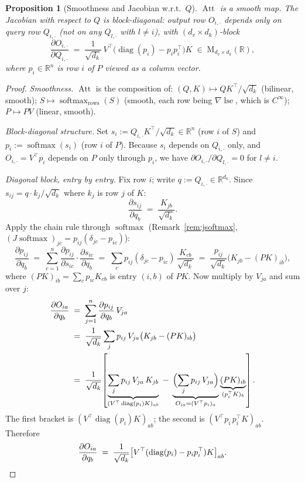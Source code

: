 \documentclass[11pt]{amsart}
\theoremstyle{plain}
\newtheorem{proposition}[theorem]{Proposition}
\theoremstyle{definition}
\newcommand{\R}{\mathbb{R}}
\newcommand{\Mat}[2]{\mathrm{M}_{#1 \times #2}(\R)}
\newcommand{\softmax}{\operatorname{softmax}}
\newcommand{\logsumexp}{\operatorname{lse}}
\newcommand{\Att}{\operatorname{Att}}
\newcommand{\diag}{\operatorname{diag}}
\begin{document}
\begin{proposition}[Smoothness and Jacobian w.r.t.\ $Q$]
\label{prop:att-smoothness}
$\Att$ is a smooth map.  The Jacobian with respect to $Q$ is block-diagonal:
output row $O_{i,\cdot}$ depends only on query row $Q_{i,\cdot}$ (not on any
$Q_{l,\cdot}$ with $l\neq i$), with $(d_v\times d_k)$-block
\[
    \frac{\partial O_{i,\cdot}}{\partial Q_{i,\cdot}}
    \;=\; \frac{1}{\sqrt{d_k}}\,
    V^\top\bigl(\diag(p_i) - p_i p_i^\top\bigr) K
    \;\in\; \Mat{d_v}{d_k},
\]
where $p_i \in \R^n$ is row $i$ of $P$ viewed as a column vector.
\end{proposition}
\begin{proof}
\textit{Smoothness.}  $\Att$ is the composition of:
$(Q,K)\mapsto QK^\top/\sqrt{d_k}$ (bilinear, smooth);
$S\mapsto\softmax_{\mathrm{rows}}(S)$ (smooth, each row being $\nabla\logsumexp$,
which is $C^\infty$);
$P\mapsto PV$ (linear, smooth).

\textit{Block-diagonal structure.}  Set $s_i := Q_{i,\cdot}K^\top/\sqrt{d_k}\in\R^n$
(row $i$ of $S$) and $p_i := \softmax(s_i)$ (row $i$ of $P$).  Because $s_i$
depends on $Q_{i,\cdot}$ only, and $O_{i,\cdot} = V^\top p_i$ depends on $P$
only through $p_i$, we have $\partial O_{i,\cdot}/\partial Q_{l,\cdot} = 0$ for
$l\neq i$.

\textit{Diagonal block, entry by entry.}  Fix row $i$; write $q := Q_{i,\cdot}\in\R^{d_k}$.
Since $s_{ij} = q\cdot k_j/\sqrt{d_k}$ where $k_j$ is row $j$ of $K$:
\[
    \frac{\partial s_{ij}}{\partial q_b} \;=\; \frac{K_{jb}}{\sqrt{d_k}}.
\]
Apply the chain rule through $\softmax$ (Remark~\ref{rem:jsoftmax},
$(J\softmax)_{jc} = p_{ij}(\delta_{jc}-p_{ic})$):
\[
    \frac{\partial p_{ij}}{\partial q_b}
    \;=\; \sum_{c=1}^n \frac{\partial p_{ij}}{\partial s_{ic}}
          \cdot\frac{\partial s_{ic}}{\partial q_b}
    \;=\; \sum_c p_{ij}(\delta_{jc} - p_{ic})\,\frac{K_{cb}}{\sqrt{d_k}}
    \;=\; \frac{p_{ij}}{\sqrt{d_k}}\bigl(K_{jb} - (PK)_{ib}\bigr),
\]
where $(PK)_{ib} = \sum_c p_{ic}K_{cb}$ is entry $(i,b)$ of $PK$.
Now multiply by $V_{ja}$ and sum over $j$:
\begin{align*}
    \frac{\partial O_{ia}}{\partial q_b}
    &\;=\; \sum_{j=1}^n \frac{\partial p_{ij}}{\partial q_b}\,V_{ja} \\
    &\;=\; \frac{1}{\sqrt{d_k}}\sum_j p_{ij}\,V_{ja}
            \bigl(K_{jb} - (PK)_{ib}\bigr) \\
    &\;=\; \frac{1}{\sqrt{d_k}}\!\left[
            \underbrace{\sum_j p_{ij}\,V_{ja}\,K_{jb}}_{(V^\top\diag(p_i)K)_{ab}}
            \;-\;
            \underbrace{\Bigl(\sum_j p_{ij}\,V_{ja}\Bigr)}_{O_{ia}=(V^\top p_i)_a}
            \underbrace{(PK)_{ib}}_{(p_i^\top K)_b}
          \right].
\end{align*}
The first bracket is $(V^\top\diag(p_i)K)_{ab}$; the second is
$(V^\top p_i\,p_i^\top K)_{ab}$.  Therefore
\[
    \frac{\partial O_{ia}}{\partial q_b}
    \;=\; \frac{1}{\sqrt{d_k}}\bigl[V^\top(\diag(p_i)-p_i p_i^\top)K\bigr]_{ab}.
    \qedhere
\]
\end{proof}
\end{document}
